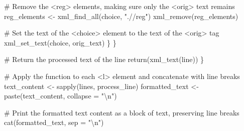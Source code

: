 \documentclass[
  letterpaper,
  DIV=11,
  numbers=noendperiod]{scrreprt}
\newenvironment{Shaded}{\begin{snugshade}}{\end{snugshade}}
\newcommand{\AttributeTok}[1]{\textcolor[rgb]{0.40,0.45,0.13}{#1}}
\newcommand{\CommentTok}[1]{\textcolor[rgb]{0.37,0.37,0.37}{#1}}
\newcommand{\FunctionTok}[1]{\textcolor[rgb]{0.28,0.35,0.67}{#1}}
\newcommand{\NormalTok}[1]{\textcolor[rgb]{0.00,0.23,0.31}{#1}}
\newcommand{\OtherTok}[1]{\textcolor[rgb]{0.00,0.23,0.31}{#1}}
\newcommand{\SpecialCharTok}[1]{\textcolor[rgb]{0.37,0.37,0.37}{#1}}
\newcommand{\StringTok}[1]{\textcolor[rgb]{0.13,0.47,0.30}{#1}}
\begin{document}
\begin{Shaded}
\begin{Highlighting}[]
      \CommentTok{\# Remove the \textless{}reg\textgreater{} elements, making sure only the \textless{}orig\textgreater{} text remains}
\NormalTok{      reg\_elements }\OtherTok{\textless{}{-}} \FunctionTok{xml\_find\_all}\NormalTok{(choice, }\StringTok{".//reg"}\NormalTok{)}
      \FunctionTok{xml\_remove}\NormalTok{(reg\_elements)}
      
      \CommentTok{\# Set the text of the \textless{}choice\textgreater{} element to the text of the \textless{}orig\textgreater{} tag}
      \FunctionTok{xml\_set\_text}\NormalTok{(choice, orig\_text)}
\NormalTok{    \}}
\NormalTok{  \}}
  
  \CommentTok{\# Return the processed text of the line}
  \FunctionTok{return}\NormalTok{(}\FunctionTok{xml\_text}\NormalTok{(line))}
\NormalTok{\}}

\CommentTok{\# Apply the function to each \textless{}l\textgreater{} element and concatenate with line breaks}
\NormalTok{text\_content }\OtherTok{\textless{}{-}} \FunctionTok{sapply}\NormalTok{(lines, process\_line)}
\NormalTok{formatted\_text }\OtherTok{\textless{}{-}} \FunctionTok{paste}\NormalTok{(text\_content, }\AttributeTok{collapse =} \StringTok{"}\SpecialCharTok{\textbackslash{}n}\StringTok{"}\NormalTok{)}

\CommentTok{\# Print the formatted text content as a block of text, preserving line breaks}
\FunctionTok{cat}\NormalTok{(formatted\_text, }\AttributeTok{sep =} \StringTok{"}\SpecialCharTok{\textbackslash{}n}\StringTok{"}\NormalTok{)}
\end{Highlighting}
\end{Shaded}
\end{document}
